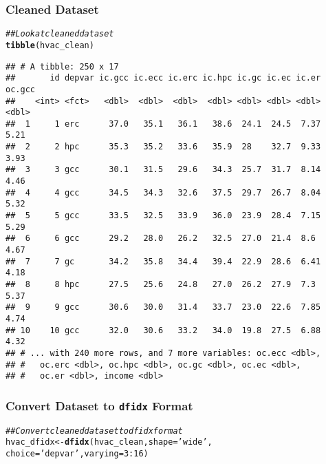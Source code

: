 \documentclass{beamer}\usepackage[]{graphicx}\usepackage[]{xcolor}
\makeatletter
\newcommand{\hlnum}[1]{\textcolor[rgb]{0.686,0.059,0.569}{#1}}%
\newcommand{\hlstr}[1]{\textcolor[rgb]{0.192,0.494,0.8}{#1}}%
\newcommand{\hlcom}[1]{\textcolor[rgb]{0.678,0.584,0.686}{\textit{#1}}}%
\newcommand{\hlopt}[1]{\textcolor[rgb]{0,0,0}{#1}}%
\newcommand{\hlstd}[1]{\textcolor[rgb]{0.345,0.345,0.345}{#1}}%
\newcommand{\hlkwb}[1]{\textcolor[rgb]{0.69,0.353,0.396}{#1}}%
\newcommand{\hlkwc}[1]{\textcolor[rgb]{0.333,0.667,0.333}{#1}}%
\newcommand{\hlkwd}[1]{\textcolor[rgb]{0.737,0.353,0.396}{\textbf{#1}}}%
\newenvironment{kframe}{%
 \def\at@end@of@kframe{}%
 \ifinner\ifhmode%
  \def\at@end@of@kframe{\end{minipage}}%
  \begin{minipage}{\columnwidth}%
 \fi\fi%
 \def\FrameCommand##1{\hskip\@totalleftmargin \hskip-\fboxsep
 \colorbox{shadecolor}{##1}\hskip-\fboxsep
     \hskip-\linewidth \hskip-\@totalleftmargin \hskip\columnwidth}%
 \MakeFramed {\advance\hsize-\width
   \@totalleftmargin\z@ \linewidth\hsize
   \@setminipage}}%
 {\par\unskip\endMakeFramed%
 \at@end@of@kframe}
\newenvironment{knitrout}{}{} %
\makeatother
\begin{document}
\begin{frame}[fragile]\frametitle{Cleaned Dataset}
\begin{knitrout}\footnotesize
{}\color{fgcolor}\begin{kframe}
\begin{alltt}
\hlcom{## Look at cleaned dataset}
\hlkwd{tibble}\hlstd{(hvac_clean)}
\end{alltt}
\begin{verbatim}
## # A tibble: 250 x 17
##       id depvar ic.gcc ic.ecc ic.erc ic.hpc ic.gc ic.ec ic.er oc.gcc
##    <int> <fct>   <dbl>  <dbl>  <dbl>  <dbl> <dbl> <dbl> <dbl>  <dbl>
##  1     1 erc      37.0   35.1   36.1   38.6  24.1  24.5  7.37   5.21
##  2     2 hpc      35.3   35.2   33.6   35.9  28    32.7  9.33   3.93
##  3     3 gcc      30.1   31.5   29.6   34.3  25.7  31.7  8.14   4.46
##  4     4 gcc      34.5   34.3   32.6   37.5  29.7  26.7  8.04   5.32
##  5     5 gcc      33.5   32.5   33.9   36.0  23.9  28.4  7.15   5.29
##  6     6 gcc      29.2   28.0   26.2   32.5  27.0  21.4  8.6    4.67
##  7     7 gc       34.2   35.8   34.4   39.4  22.9  28.6  6.41   4.18
##  8     8 hpc      27.5   25.6   24.8   27.0  26.2  27.9  7.3    5.37
##  9     9 gcc      30.6   30.0   31.4   33.7  23.0  22.6  7.85   4.74
## 10    10 gcc      32.0   30.6   33.2   34.0  19.8  27.5  6.88   4.32
## # ... with 240 more rows, and 7 more variables: oc.ecc <dbl>,
## #   oc.erc <dbl>, oc.hpc <dbl>, oc.gc <dbl>, oc.ec <dbl>,
## #   oc.er <dbl>, income <dbl>
\end{verbatim}
\end{kframe}
\end{knitrout}
\end{frame}

\begin{frame}[fragile]\frametitle{Convert Dataset to \texttt{dfidx} Format}
\begin{knitrout}\footnotesize
{}\color{fgcolor}\begin{kframe}
\begin{alltt}
\hlcom{## Convert cleaned dataset to dfidx format}
\hlstd{hvac_dfidx} \hlkwb{<-} \hlkwd{dfidx}\hlstd{(hvac_clean,} \hlkwc{shape} \hlstd{=} \hlstr{'wide'}\hlstd{,}
                    \hlkwc{choice} \hlstd{=} \hlstr{'depvar'}\hlstd{,} \hlkwc{varying} \hlstd{=} \hlnum{3}\hlopt{:}\hlnum{16}\hlstd{)}
\end{alltt}
\end{kframe}
\end{knitrout}
\end{frame}
\end{document}
